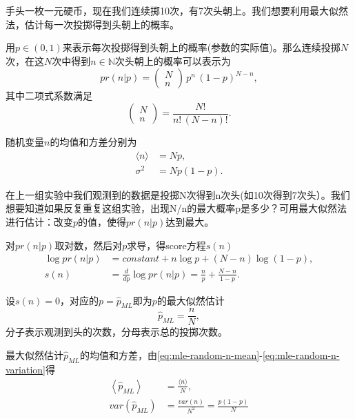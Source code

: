 手头一枚一元硬币，现在我们连续掷10次，有7次头朝上。我们想要利用最大似然法，估计每一次投掷得到头朝上的概率。

用$p\in (0,1)$来表示每次投掷得到头朝上的概率(参数的实际值)。那么连续投掷$N$次，在这$N$次中得到$n \in \mathbb{N}$次头朝上的概率可以表示为
\begin{equation}
  \label{eq:mle-bernoulli-head-prob}
  pr \left( n | p \right) = \begin{pmatrix}
  N \\ n
\end{pmatrix} \, p^{n} \, \left( 1 - p \right)^{N-n},
\end{equation}
其中二项式系数满足
\begin{equation}
  \label{eq:mle-bernoulli-head-prob-binomial}
  \begin{pmatrix}
  N \\ n
\end{pmatrix} = \frac{N!}{n! \, \left(N - n \right)!}.
\end{equation}

随机变量$n$的均值和方差分别为
\begin{align}
  \label{eq:mle-random-n-mean}
  \langle n \rangle & = N p, \\
  \label{eq:mle-random-n-variation}
  \sigma^{2} &= N p (1-p).
\end{align}

在上一组实验中我们观测到的数据是投掷N次得到n次头(如10次得到7次头）。我们想要知道如果反复重复这组实验，出现N/n的最大概率p是多少？可用最大似然法进行估计：改变$p$的值，使得$pr(n | p)$达到最大。

对$pr(n | p)$取对数，然后对$p$求导，得score方程$s(n)$
\begin{equation}
  \label{eq:mle-bernoulli-score}
  \begin{split}
      \log pr(n | p) & = constant + n \log p + (N-n) \log (1-p), \\
      s(n) & = \frac{d}{d p} \log pr(n | p) = \frac{n}{p} + \frac{N - n}{1 - p}.
  \end{split}
\end{equation}

设$s(n)=0$，对应的$p=\hat{p}_{ML}$即为$p$的最大似然估计
\begin{equation}
  \label{eq:mle-bernoulli-estimate}
  \hat{p}_{ML} = \frac{n}{N},
\end{equation}
分子表示观测到头的次数，分母表示总的投掷次数。

最大似然估计$\hat{p}_{ML}$的均值和方差，由\eqref{eq:mle-random-n-mean}-\eqref{eq:mle-random-n-variation}得
\begin{align}
  \label{eq:mle-bernoulli-estimate-mean}
  \left\langle \hat{p}_{ML} \right\rangle &= \frac{\langle n \rangle}{N}, \\
  var \left( \hat{p}_{ML} \right) & = \frac{var (n)}{N^{2}} = \frac{p (1-p)}{N }
\end{align}

